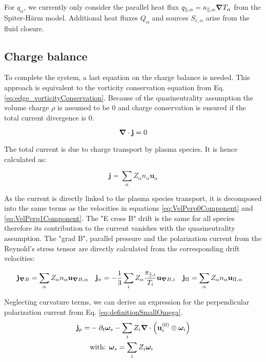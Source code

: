 For $q_\alpha$, we currently only consider the parallel heat flux $q_{\parallel,\alpha} = \kappa_{\parallel,\alpha}\grad T_\alpha$ from the Spiter-Härm model. Additional heat fluxes $Q_\alpha$ and sources $S_{\varepsilon,\alpha}$ arise from the fluid closure.



\subsection{Charge balance}

To complete the system, a last equation on the charge balance is needed. This approach is equivalent to the vorticity conservation equation from Eq. \ref{eq:edge_vorticityConservation}. Because of the quasineutrality assumption the volume charge $\rho$ is assumed to be 0 and charge conservation is ensured if the total current divergence is 0.

\begin{equation}
	\grad\cdot\mathbf{j} = 0
\end{equation}

The total current is due to charge transport by plasma species. It is hence calculated as: 

\begin{equation}
	\mathbf{j} = \sum_{\alpha} Z_\alpha n_\alpha \mathbf{u}_\alpha
\end{equation}

As the current is directly linked to the plasma species transport, it is decomposed into the same terms as the velocities in equations \ref{eq:VelPerp0Component} and \ref{eq:VelPerp1Component}. The "E cross B" drift is the same for all species therefore its contribution to the current vanishes with the quasineutrality assumption. The "grad B", parallel pressure and the polarization current from the Reynold's stress tensor are directly calculated from the corresponding drift velocities:

\begin{align}
	\mathbf{j}_{\grad B} &= \sum_{\alpha} Z_\alpha n_\alpha \mathbf{u}_{\grad B,\alpha} & \mathbf{j}_{\pi} &= -\frac{1}{3}\sum_{i} Z_\alpha  \frac{\pi_{\parallel,i}}{T_i} \mathbf{u}_{\grad B,i} & \mathbf{j}_{\Pi} &= \sum_{\alpha} Z_\alpha n_\alpha \mathbf{u}_{\Pi,\alpha}  	
\end{align}

Neglecting curvature terms, we can derive an expression for the perpendicular polarization current from Eq. \ref{eq:definitionSmallOmega}.
\begin{align}
	\mathbf{j}_{p} =& -\partial_t\boldsymbol{\omega}_s - \sum_{i}Z_i\grad\cdot\left(\mathbf{u}^{(0)}_i\otimes\boldsymbol{\omega}_i\right) \\
	&\text{with:  }\boldsymbol{\omega}_s = \sum_{i}Z_i\boldsymbol{\omega}_i \nonumber
\end{align}


